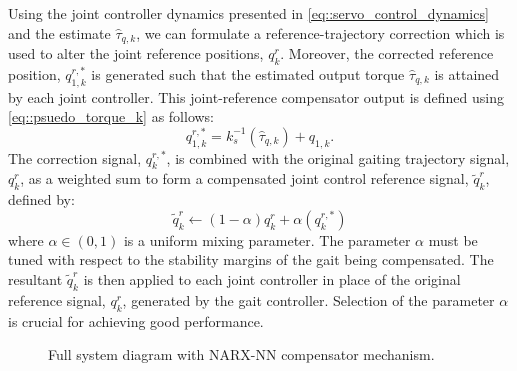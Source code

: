 			Using the joint controller dynamics presented in \ref{eq::servo_control_dynamics} and the estimate $\hat{\tau}_{q,k}$, we can formulate a reference-trajectory correction  which is used to alter the joint reference positions, ${q}_{k}^{r}$. Moreover, the corrected reference position, ${q}_{1,k}^{r,*}$ is generated such that the estimated output torque $\hat{\tau}_{q,k}$ is attained by each joint controller. This joint-reference compensator output is defined using 
			\ref{eq::psuedo_torque_k} as follows:
				\begin{equation}
				 	{q}_{1,k}^{r,*} 	= k_{s}^{-1}  \left(  \hat{\tau}_{q,k}  \right) +  {q}_{1,k}.
					\label{eq::correction_equation}
				\end{equation}
			The correction signal,  ${q}_{k}^{r,*}$, is combined with the original gaiting trajectory signal, ${q}_{k}^{r}$, as a weighted sum to form a compensated joint control reference signal, $\tilde{q}_{k}^{r}$, defined by:
				\begin{equation}
				 	\tilde{q}_{k}^{r} 	\leftarrow (1-\alpha) {q}_{k}^{r} + \alpha ( {q}_{k}^{r,*} )
					\label{eq::correction_application}
				\end{equation}
			where  $\alpha \in (0,1)$ is a uniform mixing parameter. The parameter $\alpha$ must be tuned with respect to the stability margins of the gait being compensated. The resultant $\tilde{q}_{k}^{r}$ is then applied  to each joint controller in place of the original reference signal,  ${q}_{k}^{r}$,  generated by the gait controller. Selection of the parameter $\alpha$ is crucial for achieving good performance. 

				\begin{figure}[h!]
					\centering
					\caption{Full system diagram with NARX-NN compensator mechanism.}
					\label{fig::sys_diagram}
				\end{figure}

